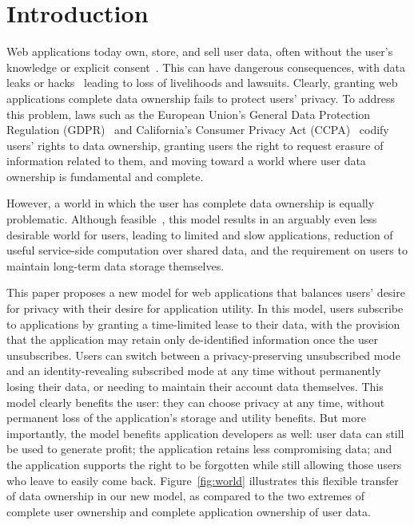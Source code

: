 \section{Introduction}

Web applications today own, store, and sell user data, often without the user's knowledge or
explicit consent~\cite{nytimes:fb, npr:data}. This can have dangerous consequences, with data leaks or
hacks~\cite{breach:twitter, breach:fb, breach:marriott, breach:quora} leading to loss of
livelihoods and lawsuits. Clearly, granting web applications complete data ownership fails to
protect users' privacy. To address this problem, laws such as the European Union's General Data
Protection Regulation (GDPR)~\cite{eu:gdpr} and California's Consumer Privacy Act
(CCPA)~\cite{ca:privacy-act} codify users' rights to data ownership, granting users the right to
request erasure of information related to them, and moving toward a world where user data 
ownership is fundamental and complete.

However, a world in which the user has complete data ownership is equally problematic.
Although feasible~\cite{amber, w5, blockstack, bstore}, this model results in an
arguably even less desirable world for users, leading to limited and slow applications, reduction of
useful service-side computation over shared data, and the requirement on users to maintain long-term
data storage themselves.  

This paper proposes a new model for web applications that balances users' desire for privacy with
their desire for application utility. In this model, users subscribe to applications by granting a
time-limited lease to their data, with the provision that the application may retain only
de-identified information once the user unsubscribes. Users can switch between a privacy-preserving
unsubscribed mode and an identity-revealing subscribed mode at any time without permanently losing
their data, or needing to maintain their account data themselves.  This model clearly benefits the
user: they can choose privacy at any time, without permanent loss of the application's storage and
utility benefits. But more importantly, the model benefits application developers as well: user data
can still be used to generate profit; the application retains less compromising data; and the
application supports the right to be forgotten while still allowing those users who leave to
easily come back. Figure~\ref{fig:world} illustrates this flexible transfer of data ownership in our
new model, as compared to the two extremes of complete user ownership and complete application
ownership of user data.

